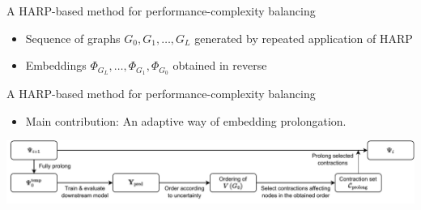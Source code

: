 \documentclass[10pt]{beamer}
\begin{document}
\begin{frame}{A HARP-based method for performance-complexity balancing}
	\begin{itemize}
		\item<1-> Sequence of graphs \( G_0, G_1, \dots, G_L \) generated by repeated application of HARP
		\item<2-> Embeddings \( \Phi_{G_L}, \dots, \Phi_{G_1}, \Phi_{G_0} \) obtained in reverse
	\end{itemize}

	\vfill

	\centering
\end{frame}

\begin{frame}{A HARP-based method for performance-complexity balancing}
	\begin{itemize}
		\item Main contribution: An adaptive way of embedding prolongation.
	\end{itemize}

	\vfill

	\centering
	\includegraphics[width=\linewidth]{images/adaptive-prolongation/adaptive-prolongation.pdf}
\end{frame}
\end{document}

